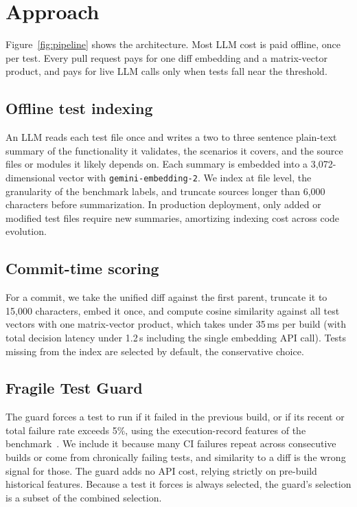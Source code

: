 \section{Approach}
\label{sec:approach}



Figure~\ref{fig:pipeline} shows the architecture. Most LLM cost is paid offline, once per test. Every pull request pays for one diff embedding and a matrix-vector product, and pays for live LLM calls only when tests fall near the threshold.

\subsection{Offline test indexing}
\label{sec:indexing}

An LLM reads each test file once and writes a two to three sentence plain-text summary of the functionality it validates, the scenarios it covers, and the source files or modules it likely depends on. Each summary is embedded into a 3,072-dimensional vector with \texttt{gemini-embedding-2}. We index at file level, the granularity of the benchmark labels, and truncate sources longer than 6,000 characters before summarization. In production deployment, only added or modified test files require new summaries, amortizing indexing cost across code evolution.

\subsection{Commit-time scoring}
\label{sec:scoring}

For a commit, we take the unified diff against the first parent, truncate it to 15,000 characters, embed it once, and compute cosine similarity against all test vectors with one matrix-vector product, which takes under 35\,ms per build (with total decision latency under 1.2\,s including the single embedding API call). Tests missing from the index are selected by default, the conservative choice.

\subsection{Fragile Test Guard}
\label{sec:guard}

The guard forces a test to run if it failed in the previous build, or if its recent or total failure rate exceeds 5\%, using the execution-record features of the benchmark~\cite{yaraghi2023tcpci}. We include it because many CI failures repeat across consecutive builds or come from chronically failing tests, and similarity to a diff is the wrong signal for those. The guard adds no API cost, relying strictly on pre-build historical features. Because a test it forces is always selected, the guard's selection is a subset of the combined selection.

